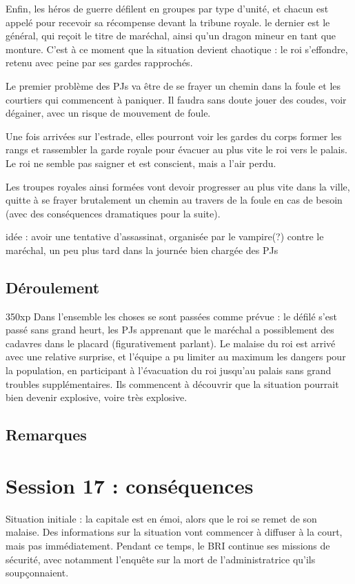\documentclass[10pt,a4paper]{book}
\begin{document}
Enfin, les héros de guerre défilent en groupes par type d'unité, et chacun est appelé pour recevoir sa récompense devant la tribune royale. le dernier est le général, qui reçoit le titre de maréchal, ainsi qu'un dragon mineur en tant que monture. C'est à ce moment que la situation devient chaotique : le roi s'effondre, retenu avec peine par ses gardes rapprochés. 

Le premier problème des PJs va être de se frayer un chemin dans la foule et les courtiers qui commencent à paniquer. Il faudra sans doute jouer des coudes, voir dégainer, avec un risque de mouvement de foule. 

Une fois arrivées sur l'estrade, elles pourront voir les gardes du corps former les rangs et rassembler la garde royale pour évacuer au plus vite le roi vers le palais. Le roi ne semble pas saigner et est conscient, mais a l'air perdu.

Les troupes royales ainsi formées vont devoir progresser au plus vite dans la ville, quitte à se frayer brutalement un chemin au travers de la foule en cas de besoin (avec des conséquences dramatiques pour la suite).

idée : avoir une tentative d'assassinat, organisée par le vampire(?) contre le maréchal, un peu plus tard dans la journée bien chargée des PJs

\subsection{Déroulement}
350xp
Dans l'ensemble les choses se sont passées comme prévue : le défilé s'est passé sans grand heurt, les PJs apprenant que le maréchal a possiblement des cadavres dans le placard (figurativement parlant). Le malaise du roi est arrivé avec une relative surprise, et l'équipe a pu limiter au maximum les dangers pour la population, en participant à l'évacuation du roi jusqu'au palais sans grand troubles supplémentaires. Ils commencent à découvrir que la situation pourrait bien devenir explosive, voire très explosive.
\subsection{Remarques}
\section{Session 17 : conséquences}
Situation initiale : la capitale est en émoi, alors que le roi se remet de son malaise. Des informations sur la situation vont commencer à diffuser à la court, mais pas immédiatement. Pendant ce temps, le BRI continue ses missions de sécurité, avec notamment l'enquête sur la mort de l'administratrice qu'ils soupçonnaient.
\end{document}
